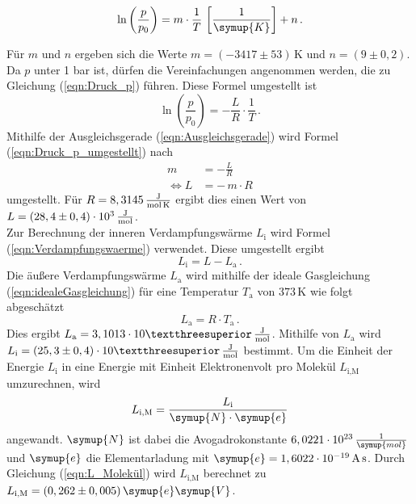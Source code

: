     \begin{equation}
      \label{eqn:Ausgleichsgerade}
      \ln{\left(\frac{p}{p_0}\right)} = m \cdot \frac{1}{T} \,\left[\frac{1}{\symup{K}}\right] + n \, . 
    \end{equation}

    Für $m$ und $n$ ergeben sich die Werte $m = (-3417 \pm 53) \, \unit{\kelvin}$
    und $n = (9 \pm 0,2)$.
    Da $p$ unter 1 bar ist, dürfen die Vereinfachungen angenommen werden, die zu Gleichung (\ref{eqn:Druck_p}) führen. Diese Formel umgestellt ist 
    \begin{equation}
      \label{eqn:Druck_p_umgestellt}
      \ln{\left(\frac{p}{p_0}\right)} = - \frac{L}{R} \cdot \frac{1}{T} \, . 
    \end{equation}
    Mithilfe der Ausgleichsgerade (\ref{eqn:Ausgleichsgerade}) wird Formel 
    (\ref{eqn:Druck_p_umgestellt}) nach 
    \begin{align}
      m &= - \frac{L}{R} \\
      \Leftrightarrow L &= - \, m \cdot R
    \end{align}
    umgestellt. Für $R = 8,3145 \, \unit[per-mode=fraction]{\joule\per\mol\per\kelvin}$ \cite{R_Konstante} ergibt dies einen Wert von $L = (28,4 \pm 0,4) \cdot 10^3 \, \unit[per-mode=fraction]{\joule\per\mol}$.
    \\
    Zur Berechnung der inneren Verdampfungswärme $L_{\text{i}}$ wird Formel (\ref{eqn:Verdampfungswaerme}) verwendet. Diese umgestellt ergibt 
    \begin{equation}
      L_{\text{i}} = L - L_{\text{a}} \, . 
    \end{equation}
    Die äußere Verdampfungswärme $L_{\text{a}}$ wird mithilfe der ideale Gasgleichung (\ref{eqn:idealeGasgleichung}) für eine Temperatur $T_{\text{a}}$ von $373 \, \unit{\kelvin}$ wie folgt abgeschätzt
    \begin{equation}
      L_{\text{a}} = R \cdot  T_{\text{a}}\, . 
    \end{equation}
    Dies ergibt $L_{\text{a}} = 3,1013 \cdot 10³ \, \unit[per-mode=fraction]{\joule\per\mol}$. 
    Mithilfe von $L_{\text{a}}$ wird $L_{\text{i}} = (25,3 \pm 0,4) \cdot 10³ \, \unit[per-mode=fraction]{\joule\per\mol}$ bestimmt. 
    Um die Einheit der Energie $L_{\text{i}}$ in eine Energie mit Einheit Elektronenvolt pro Molekül $L_{\text{i,M}}$ umzurechnen, wird 
    \begin{equation}
      L_{\text{i,M}} = \frac{L_{\text{i}}}{\symup{N} \cdot \symup{e}}
      \label{eqn:L_Molekül}
    \end{equation}
    angewandt. $\symup{N}$ ist dabei die Avogadrokonstante $6,0221 \cdot 10^{23} \, \frac{1}{\symup{mol}}$ und $\symup{e}$ die Elementarladung mit 
    $\symup{e} = 1,6022 \cdot 10^{-19} \, \unit{\ampere\second}$. 
    Durch Gleichung (\ref{eqn:L_Molekül}) wird $L_{\text{i,M}}$ berechnet zu $L_{\text{i,M}} = (0,262 \pm 0,005) \, \symup{e}\symup{V}$.
    
